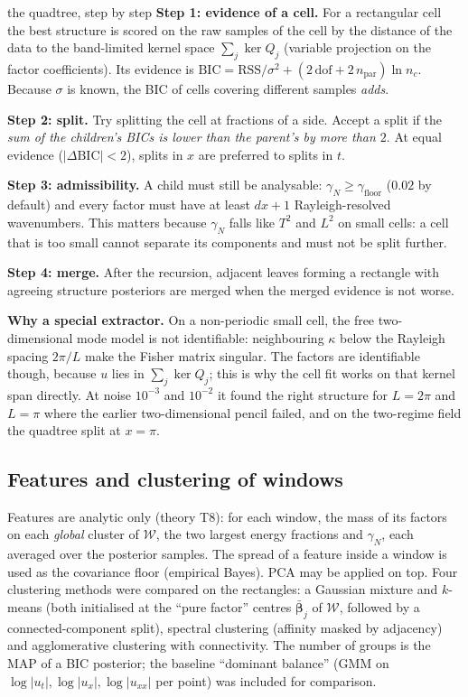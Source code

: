 \documentclass[11pt,a4paper]{article}
\theoremstyle{definition}
\newcommand{\thy}[1]{\textcolor{cG}{\textsf{\footnotesize(theory #1)}}}
\newcommand{\bs}{\boldsymbol}
\begin{document}
\begin{explained}{the quadtree, step by step}
\textbf{Step 1: evidence of a cell.} For a rectangular cell the best structure is scored on the raw samples of the cell by the distance of the data to the band-limited kernel space $\sum_j\ker Q_j$ (variable projection on the factor coefficients). Its evidence is $\mathrm{BIC}=\mathrm{RSS}/\sigma^2+(2\,\mathrm{dof}+2\,n_{\mathrm{par}})\ln n_c$. Because $\sigma$ is known, the BIC of cells covering different samples \emph{adds}.

\medskip\textbf{Step 2: split.} Try splitting the cell at fractions of a side. Accept a split if the \emph{sum of the children's BICs is lower than the parent's by more than $2$}. At equal evidence ($|\Delta\mathrm{BIC}|<2$), splits in $x$ are preferred to splits in $t$.

\medskip\textbf{Step 3: admissibility.} A child must still be analysable: $\gamma_N\ge\gamma_{\mathrm{floor}}$ ($0.02$ by default) and every factor must have at least $dx+1$ Rayleigh-resolved wavenumbers. This matters because $\gamma_N$ falls like $T^2$ and $L^2$ on small cells: a cell that is too small cannot separate its components and must not be split further.

\medskip\textbf{Step 4: merge.} After the recursion, adjacent leaves forming a rectangle with agreeing structure posteriors are merged when the merged evidence is not worse.

\medskip\textbf{Why a special extractor.} On a non-periodic small cell, the free two-dimensional mode model is not identifiable: neighbouring $\kappa$ below the Rayleigh spacing $2\pi/L$ make the Fisher matrix singular. The factors are identifiable though, because $u$ lies in $\sum_j\ker Q_j$; this is why the cell fit works on that kernel span directly. At noise $10^{-3}$ and $10^{-2}$ it found the right structure for $L=2\pi$ and $L=\pi$ where the earlier two-dimensional pencil failed, and on the two-regime field the quadtree split at $x=\pi$.
\end{explained}

\subsection{Features and clustering of windows}
Features are analytic only \thy{T8}: for each window, the mass of its factors on each \emph{global} cluster of $\mathcal W$, the two largest energy fractions and $\gamma_N$, each averaged over the posterior samples. The spread of a feature inside a window is used as the covariance floor (empirical Bayes). PCA may be applied on top. Four clustering methods were compared on the rectangles: a Gaussian mixture and $k$-means (both initialised at the ``pure factor'' centres $\bar{\bs\beta}_j$ of $\mathcal W$, followed by a connected-component split), spectral clustering (affinity masked by adjacency) and agglomerative clustering with connectivity. The number of groups is the MAP of a BIC posterior; the baseline ``dominant balance'' (GMM on $\log|u_t|,\log|u_x|,\log|u_{xx}|$ per point) was included for comparison.
\end{document}
